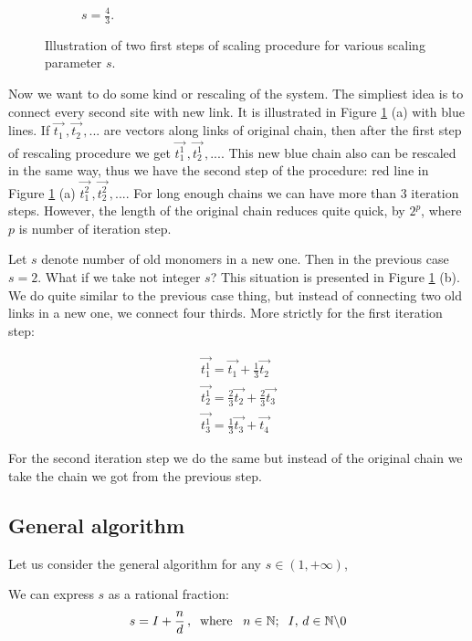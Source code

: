 \documentclass[12pt]{article}
\begin{document}
\begin{mySection}[Algorithm]
\begin{figure}
\begin{subfigure}{0.45\linewidth}
  		\caption{$s = \frac{4}{3}$.}
  	\end{subfigure}
  	\caption{Illustration of two first steps of scaling procedure for various scaling parameter $s$. }
	\label{fig:theoreticalScaling}
\end{figure}
Now we want to do some kind or rescaling of the system. The simpliest idea is to connect every second site with new link. It is illustrated in Figure \ref{fig:theoreticalScaling} (a) with blue lines.
If $\vec{t_1}\,,\vec{t_2}\,,...$ are vectors along links of original chain, then after the first step of rescaling procedure we get $\vec{t_1^1}\,,\vec{t_2^1}\,,...$. This new blue chain also can be rescaled in the same way, thus we have the second step of the procedure: red line in Figure \ref{fig:theoreticalScaling} (a) $\vec{t_1^2}\,,\vec{t_2^2}\,,...$. For long enough chains we can have more than 3 iteration steps. However, the length of the original chain reduces quite quick, by $2^p$, where $p$ is number of iteration step.

Let $s$ denote number of old monomers in a new one. Then  in the previous case $s=2$. What if we take not integer $s$? This situation is presented in Figure \ref{fig:theoreticalScaling} (b). We do quite similar to the previous case thing, but instead of connecting two old links in a new one, we connect four thirds. More strictly for the first iteration step:

\begin{gather*}
\vec{t_1^1} = \vec{t_1} + \frac{1}{3}\vec{t_2}\\
\vec{t_2^1} = \frac{2}{3}\vec{t_2} + \frac{2}{3}\vec{t_3}\\
\vec{t_3^1} = \frac{1}{3}\vec{t_3} + \vec{t_4}
\end{gather*}

For the second iteration step we do the same but instead of the original chain we take the chain we got from the previous step.

\subsection{General algorithm}
Let us consider the general algorithm for any $s\in(1,+\infty)$, 

We can express $s$ as a rational fraction:
\begin{equation}
s = I+\frac{n}{d}\,,\;\;{\rm where}\;\;\; n\in \mathbb{N};\;\;I,\,d \in \mathbb{N}\backslash 0
\label{eq:s}
\end{equation}


\end{mySection}
\end{document}
